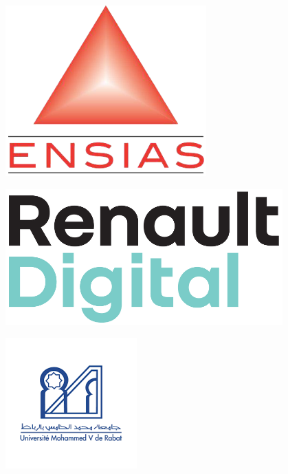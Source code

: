 \begin{titlepage}
\begin{center}

\begin{minipage}{.2\textwidth}%
\includegraphics[width=.8\textwidth]{images/ensias}
 \end{minipage}%
 \hfill
 \begin{minipage}{.33\textwidth}%
 \centering
 \includegraphics[width=0.8\textwidth]{./images/renault_digital}
 \end{minipage}%
 \hfill
 \begin{minipage}{.2\textwidth}%
 \includegraphics[width=\textwidth]{images/um5}
 \end{minipage}
 


\end{center}
\end{titlepage}
